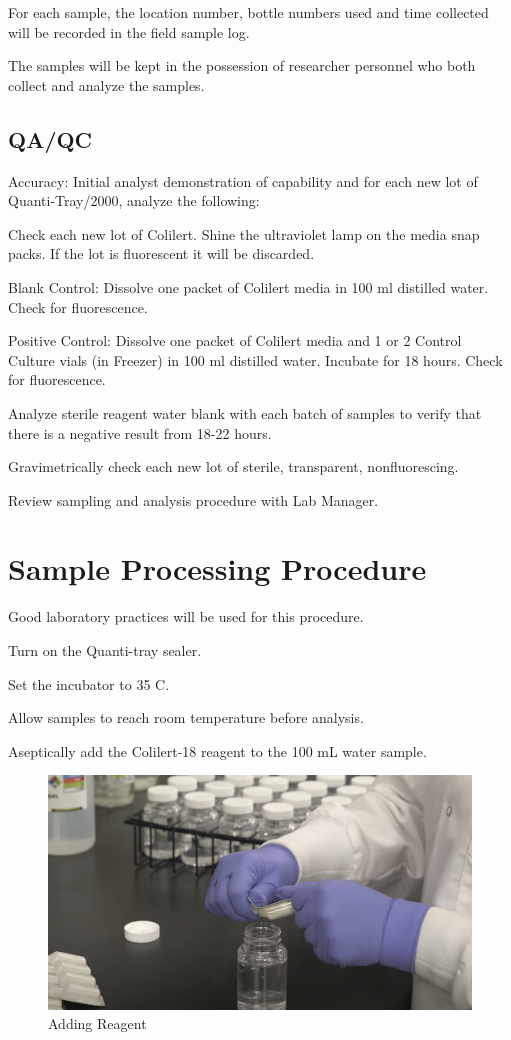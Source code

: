 \documentclass[12pt]{../SOP4_alpha}\usepackage[]{graphicx}\usepackage[]{xcolor}
\begin{document}
\NP For each sample, the location number, bottle numbers used and time
collected will be recorded in the field sample log.

\NP The samples will be kept in the possession of researcher personnel who both collect and analyze the samples.


\subsection{QA/QC}

\NP Accuracy: Initial analyst demonstration of capability and for each new lot of Quanti-Tray/2000, analyze the following:

\NP Check each new lot of Colilert. Shine the ultraviolet lamp on the media snap packs. If the lot is fluorescent it will be discarded.

\NP Blank Control: Dissolve one packet of Colilert media in 100 ml distilled water. %
Check for fluorescence.

\NP Positive Control: Dissolve one packet of Colilert media and 1 or 2 Control Culture vials (in Freezer) in 100 ml distilled water. Incubate for 18 hours. Check for fluorescence.

\NP Analyze sterile reagent water blank with each batch of samples to
verify that there is a negative result from 18-22 hours.

\NP Gravimetrically check each new lot of sterile, transparent, nonfluorescing.

\NP Review sampling and analysis procedure with Lab Manager.

\section{Sample Processing Procedure}

Good laboratory practices will be used for this procedure.

\NP Turn on the Quanti-tray sealer. 

\NP Set the incubator to 35 \degree C.

\NP Allow samples to reach room temperature before analysis.

\NP Aseptically add the Colilert-18 reagent to the 100 mL water sample.

\begin{figure}[h]
\includegraphics[width=1.0\textwidth]{figures/AddingReagent.png}
\caption{Adding Reagent}
\label{fig:Adding Reagent}
\end{figure}
\end{document}
